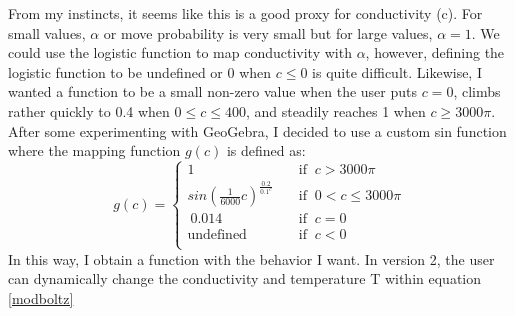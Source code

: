 \vspace{0.3cm}
\noindent
From my instincts, it seems like this is a good proxy for conductivity (c). For small values, $\alpha$ or move probability is very small but for large values, $\alpha=1$. We could use the logistic function to map conductivity with $\alpha$, however, defining the logistic function to be undefined or 0 when $c\le 0$ is quite difficult. Likewise, I wanted a function to be a small non-zero value when the user puts $c=0$, climbs rather quickly to 0.4 when $0 \leq c \leq 400$, and steadily reaches 1 when $c \geq 3000\pi$. After some experimenting with GeoGebra, I decided to use a custom sin function where the mapping function $g(c)$ is defined as: 
\begin{equation}
g(c) = 
     \begin{cases}
       1 & \quad\text{if} \;\; c>3000\pi \\
       sin(\frac{1}{6000}c)^\frac{0.2}{0.1^c} &\quad\text{if} \;\; 0 < c \leq 3000\pi \\
       ~0.014 &\quad\text{if} \;\; c=0 \\
       \text{undefined} &\quad\text{if} \;\; c<0 \\ 
     \end{cases}
    \label{Mapping}
\end{equation}
In this way, I obtain a function with the behavior I want. In version 2, the user can dynamically change the conductivity and temperature T within equation \ref{modboltz} \par

